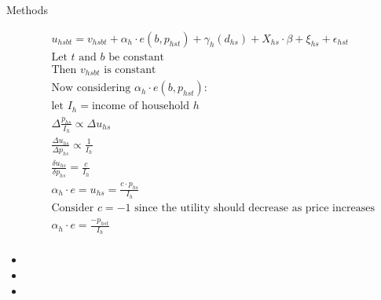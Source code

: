 \documentclass[final]{beamer}
\newlength{\onecolwid}
\newlength{\twocolwid}
\begin{document}
\begin{frame}[t]
\begin{columns}[t]
\begin{column}{\twocolwid}
\begin{columns}[t,totalwidth=\twocolwid]
\begin{column}{\onecolwid}
\begin{block}{Methods}
{\small
\begin{eqnarray*}
&& u_{hsbt} = v_{hsbt} + \alpha_{h}\cdot e(b,p_{hst}) + \gamma_{h}(d_{hs}) + X_{hs}\cdot \beta +\xi_{hs}+\epsilon_{hst} \\
&& \mbox{Let $t$ and $b$ be constant}\\
&& \mbox{Then $v_{hsbt}$ is constant}\\
&& \mbox{Now considering $\alpha_{h}\cdot e(b,p_{hst})$:}\\
&&      \mbox{let } I_{h} = \mbox{income of household $h$}\\
&&      \Delta \frac{p_{hs}}{I_{h}} \propto \Delta u_{hs}\\
&&      \frac{\Delta u_{hs}}{\Delta p_{hs}} \propto \frac{1}{I_{h}}\\
&&      \frac{\delta u_{hs}}{\delta p_{hs}} = \frac{c}{I_{h}}\\
&&      \alpha_h \cdot e=u_{hs} = \frac{c\cdot p_{hs}}{I_{h}}\\
&&      \mbox{Consider $c=-1$ since the utility should decrease as price increases}\\
&& 	    \alpha_h \cdot e = \frac{ -p_{hst}}{I_{h}}\\
\end{eqnarray*}

\begin{itemize}
\item 
\item
\item \end{itemize}
}
\end{block}






\end{column} %

\end{columns} %


\end{column}
\end{columns}
\end{frame}
\end{document}
